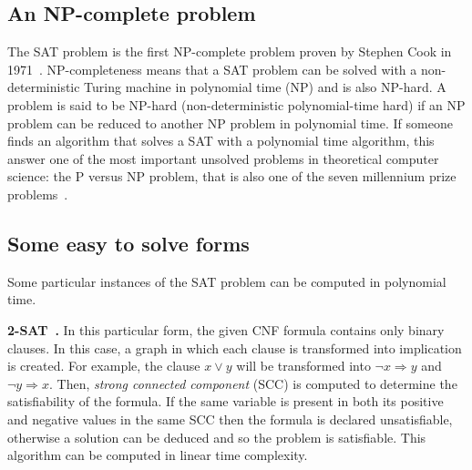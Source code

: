 \subsection{An NP-complete problem}
The SAT problem is the first NP-complete problem proven by Stephen Cook in 1971~\cite{cook1971complexity}.
NP-completeness means that a SAT problem can be solved with a non-deterministic Turing machine in polynomial time (NP) and is also NP-hard.
A problem is said to be NP-hard (non-deterministic polynomial-time hard) if an NP problem 
can be reduced to another NP problem in polynomial time.
If someone finds an algorithm that solves a SAT with a polynomial time algorithm, this answer 
one of the most important unsolved problems in theoretical computer science: the P versus NP problem,
 that is also one of the seven millennium prize problems~\cite{carlson2006millennium}.
\subsection{Some easy to solve forms}
Some particular instances of the SAT problem can be computed in polynomial time.

\textbf{2-SAT~\cite{aspvall1979linear}.}
In this particular form, the given CNF formula contains only binary clauses.
In this case, a graph in which each clause is transformed into implication is created.
For example, the clause $x \lor y$ will be transformed into $ \neg x \Rightarrow y$ and $\neg y \Rightarrow x$.
Then, \emph{strong connected component} (SCC) is computed to determine the satisfiability of the formula.
If the same variable is present in both its positive and negative values in the same SCC then the formula is declared unsatisfiable,
otherwise a solution can be deduced and so the problem is satisfiable. 
This algorithm can be computed in linear time complexity.


